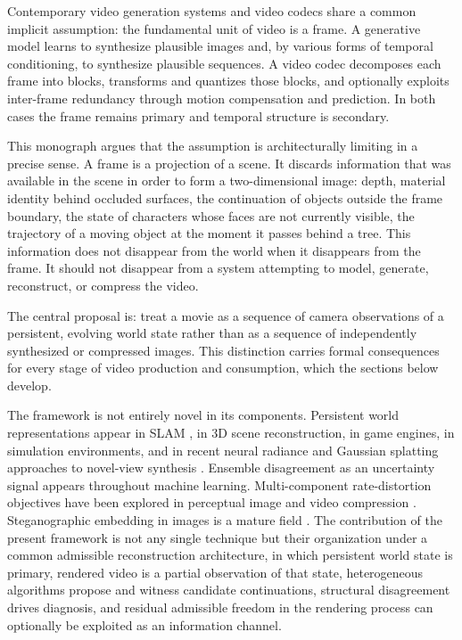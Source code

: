 \documentclass[11pt,a4paper]{article}
\theoremstyle{plain}
\theoremstyle{definition}
\theoremstyle{remark}
\begin{document}
Contemporary video generation systems and video codecs share a common implicit assumption: the fundamental unit of video is a frame. A generative model learns to synthesize plausible images and, by various forms of temporal conditioning, to synthesize plausible sequences. A video codec decomposes each frame into blocks, transforms and quantizes those blocks, and optionally exploits inter-frame redundancy through motion compensation and prediction. In both cases the frame remains primary and temporal structure is secondary.

This monograph argues that the assumption is architecturally limiting in a precise sense. A frame is a projection of a scene. It discards information that was available in the scene in order to form a two-dimensional image: depth, material identity behind occluded surfaces, the continuation of objects outside the frame boundary, the state of characters whose faces are not currently visible, the trajectory of a moving object at the moment it passes behind a tree. This information does not disappear from the world when it disappears from the frame. It should not disappear from a system attempting to model, generate, reconstruct, or compress the video.

The central proposal is: treat a movie as a sequence of camera observations of a persistent, evolving world state rather than as a sequence of independently synthesized or compressed images. This distinction carries formal consequences for every stage of video production and consumption, which the sections below develop.

The framework is not entirely novel in its components. Persistent world representations appear in SLAM \cite{davison2007monoslam}, in 3D scene reconstruction, in game engines, in simulation environments, and in recent neural radiance and Gaussian splatting approaches to novel-view synthesis \cite{mildenhall2020nerf,kerbl2023gaussians}. Ensemble disagreement as an uncertainty signal appears throughout machine learning. Multi-component rate-distortion objectives have been explored in perceptual image and video compression \cite{wang2004ssim}. Steganographic embedding in images is a mature field \cite{fridrich2009steganography}. The contribution of the present framework is not any single technique but their organization under a common admissible reconstruction architecture, in which persistent world state is primary, rendered video is a partial observation of that state, heterogeneous algorithms propose and witness candidate continuations, structural disagreement drives diagnosis, and residual admissible freedom in the rendering process can optionally be exploited as an information channel.
\end{document}
